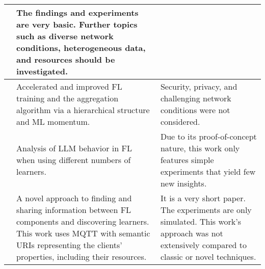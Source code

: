 \begin{changemargin}{-2cm}{0cm}
\begin{tabular}{|c||m{0.4\paperwidth}|m{0.4\paperwidth}|}
            &
            The findings and experiments are very basic.
            Further topics such as diverse network conditions, heterogeneous data, and resources should be investigated.
        \\
        \hline
            \cite{paper:hfl_with_momentum_acceleration_in_multi_tier_networks}
            &
            Accelerated and improved FL training and the aggregation algorithm via a hierarchical structure and ML momentum.
            &
            Security, privacy, and challenging network conditions were not considered.
        \\
        \hline
            \cite{paper:scaling_fl_for_fine_tuning_llms}
            &
            Analysis of LLM behavior in FL when using different numbers of learners.
            &
            Due to its proof-of-concept nature, this work only features simple experiments that yield few new insights.
        \\
        \hline
            \cite{paper:edge_fl_via_mqtt_and_oma_lightweight_m2m}
            &
            A novel approach to finding and sharing information between FL components and discovering learners.
            This work uses MQTT with semantic URIs representing the clients' properties, including their resources.
            &
            It is a very short paper.
            The experiments are only simulated.
            This work's approach was not extensively compared to classic or novel techniques.
        \\
        \hline
    \end{tabular}
    \label{table:additional_fl_research_table_1}
\end{changemargin}

